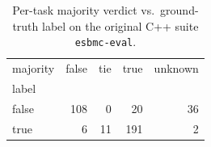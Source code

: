 \begin{table}[t]
  \centering
  \caption{Per-task majority verdict vs.\ ground-truth label on the original C++ suite \texttt{esbmc-eval}.}
  \label{tab:majority-esbmc-eval}
\begin{tabular}{lrrrr}
\toprule
majority & false & tie & true & unknown \\
label &  &  &  &  \\
\midrule
false & 108 & 0 & 20 & 36 \\
true & 6 & 11 & 191 & 2 \\
\bottomrule
\end{tabular}
\end{table}
